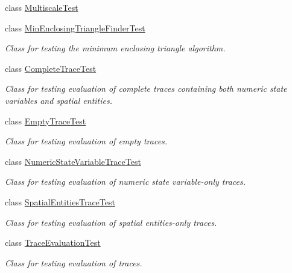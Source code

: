 \begin{DoxyCompactItemize}
\item 
class \hyperlink{classmultiscaletest_1_1MultiscaleTest}{Multiscale\-Test}
\item 
class \hyperlink{classmultiscaletest_1_1MinEnclosingTriangleFinderTest}{Min\-Enclosing\-Triangle\-Finder\-Test}
\begin{DoxyCompactList}\small\item\em Class for testing the minimum enclosing triangle algorithm. \end{DoxyCompactList}\item 
class \hyperlink{classmultiscaletest_1_1CompleteTraceTest}{Complete\-Trace\-Test}
\begin{DoxyCompactList}\small\item\em Class for testing evaluation of complete traces containing both numeric state variables and spatial entities. \end{DoxyCompactList}\item 
class \hyperlink{classmultiscaletest_1_1EmptyTraceTest}{Empty\-Trace\-Test}
\begin{DoxyCompactList}\small\item\em Class for testing evaluation of empty traces. \end{DoxyCompactList}\item 
class \hyperlink{classmultiscaletest_1_1NumericStateVariableTraceTest}{Numeric\-State\-Variable\-Trace\-Test}
\begin{DoxyCompactList}\small\item\em Class for testing evaluation of numeric state variable-\/only traces. \end{DoxyCompactList}\item 
class \hyperlink{classmultiscaletest_1_1SpatialEntitiesTraceTest}{Spatial\-Entities\-Trace\-Test}
\begin{DoxyCompactList}\small\item\em Class for testing evaluation of spatial entities-\/only traces. \end{DoxyCompactList}\item 
class \hyperlink{classmultiscaletest_1_1TraceEvaluationTest}{Trace\-Evaluation\-Test}
\begin{DoxyCompactList}\small\item\em Class for testing evaluation of traces. \end{DoxyCompactList}\end{DoxyCompactItemize}
